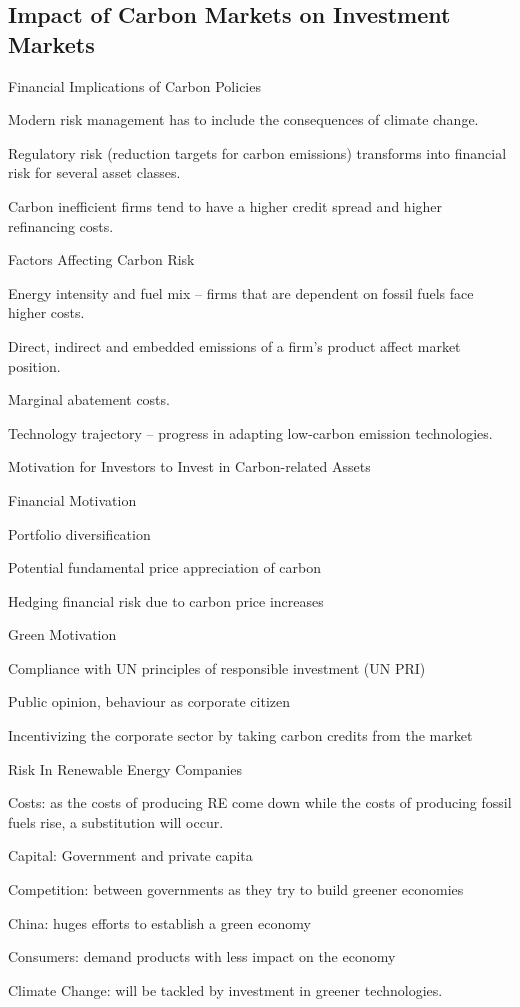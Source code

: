 \subsection{Impact of Carbon Markets on Investment Markets}

{Financial Implications of Carbon Policies}
\item<1-> Modern risk management has to include the consequences of climate change.
\item<2-> Regulatory risk (reduction targets for carbon emissions) transforms into financial risk  for several asset classes.
\item<3-> Carbon inefficient firms tend to have a higher credit spread and higher refinancing costs.

{Factors Affecting Carbon Risk}
\item<1-> Energy intensity and fuel mix -- firms that are dependent on fossil fuels face higher costs.
\item<2-> Direct, indirect and embedded emissions of a firm's product affect market position.
\item<3-> Marginal abatement costs.
\item<4-> Technology trajectory -- progress in adapting low-carbon emission technologies.

{Motivation for Investors to Invest in Carbon-related Assets}
\item<1-> Financial Motivation
\item Portfolio diversification
\item Potential fundamental price appreciation of carbon
\item Hedging financial risk due to carbon price increases
\item<2-> Green Motivation
\item Compliance with UN principles of responsible investment (UN PRI)
\item Public opinion, behaviour as corporate citizen
\item Incentivizing the corporate sector by taking carbon credits from the market

{Risk In Renewable Energy Companies}
\item<1-> Costs: as the costs of producing RE come down while the costs of producing fossil fuels rise, a
substitution will occur.
\item<2-> Capital: Government and private capita
\item<3-> Competition: between governments as they try to build greener economies
\item<4-> China: huges efforts to establish a green economy
\item<5-> Consumers: demand products with less impact on the economy
\item<6-> Climate Change: will be tackled by investment in greener technologies.

